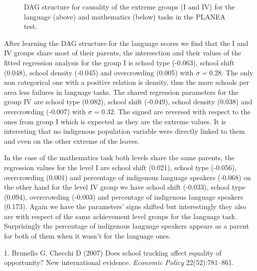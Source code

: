 \documentclass[9pt,twocolumn,twoside,]{pnas-new}
\begin{document}
\begin{figure*}
\quad
{}
\quad
{}
\quad
{}
\caption{DAG structure for causality of the extreme groups (I and IV) for the language (above) and mathematics (below) tasks in the PLANEA test.}
\label{fig:dags}
\end{figure*}

After learning the DAG structure for the language scores we find that
the I and IV groups share most of their parents, the intersection and
their values of the fitted regression analysis for the group I is school
type (-0.063), school shift (0.048), school density (-0.045) and
overcrowding (0.005) with \(\sigma=0.28\). The only non categorical one
with a positive relation is density, thus the more schools per area less
failures in language tasks. The shared regression parameters for the
group IV are school type (0.082), school shift (-0.049), school density
(0.038) and overcrowding (-0.007) with \(\sigma=0.32\). The signed are
reversed with respect to the ones from group I which is expected as they
are the extreme values. It is interesting that no indigenous population
variable were directly linked to them and even on the other extreme of
the leaves.

In the case of the mathematics task both levels share the same parents,
the regression values for the level I are school shift (0.021), school
type (-0.056), overcrowding (0.001) and percentage of indigenous
language speakers (-0.068) on the other hand for the level IV group we
have school shift (-0.033), school type (0.094), overcrowding (-0.003)
and percentage of indigenous language speakers (0.173). Again we have
the parameters' signs shifted but interestingly they also are with
respect of the same achievement level groups for the language task.
Surprisingly the percentage of indigenous language speakers appears as a
parent for both of them when it wasn't for the language ones.

\showmatmethods
\showacknow
\pnasbreak

\hypertarget{refs}{}
\leavevmode\hypertarget{ref-Brunello2007}{}%
1. Brunello G, Checchi D (2007) Does school tracking affect equality of
opportunity? New international evidence. \emph{Economic Policy}
22(52):781--861.
\end{document}
